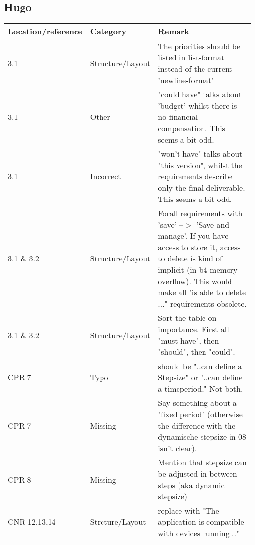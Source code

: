 \subsection*{Hugo}

\begin{tabular}{l|l|p{}}
Location/reference & Category & Remark\\
\hline
\hline
3.1 & Structure/Layout & The priorities should be listed in list-format instead of the current 'newline-format'\\
3.1 & Other & "could have" talks about 'budget' whilst there is no financial compensation. This seems a bit odd.\\
3.1 & Incorrect & "won't have" talks about "this version", whilst the requirements describe only the final deliverable. This seems a bit odd.\\
3.1 \& 3.2 & Structure/Layout & Forall requirements with 'save' --$>$ 'Save and manage'. If you have access to store it, access to delete is kind of implicit (in b4 memory overflow). This would make all 'is able to delete ..." requirements obsolete.\\
3.1 \& 3.2 & Structure/Layout & Sort the table on importance. First all "must have", then "should", then "could".\\
CPR 7 & Typo & should be "..can define a Stepsize" 	or	"..can define a timeperiod."	Not both.\\
CPR 7 & Missing &  Say something about a "fixed period" (otherwise the difference with the dynamische stepsize in 08 isn't clear).\\
CPR 8 & Missing & Mention that stepsize can be adjusted in between steps (aka dynamic stepsize)\\
CNR 12,13,14 & Strcture/Layout & replace with "The application is compatible with devices running .."\\

\end{tabular}

